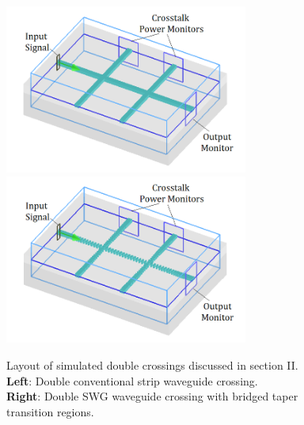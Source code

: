 \documentclass[aps,prl,twocolumn, superscriptaddress]{revtex4}
\begin{document}
\begin{figure}[htbp]
    \centering
    \includegraphics[width=8cm]{reg2diag.png}
    \includegraphics[width=8cm]{swg2diag.png}
    \caption{Layout of simulated double crossings discussed in section II. \\ \textbf{Left}: Double conventional strip waveguide crossing. \\ \textbf{Right}: Double SWG waveguide crossing with bridged taper transition regions.}
    \label{fig:diagsDouble}
\end{figure}
\end{document}

